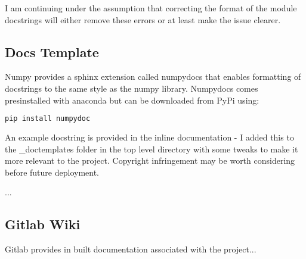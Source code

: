 \documentclass{article}
\begin{document}
I am continuing under the assumption that correcting the format of the module docstrings will either remove these errors or at least make the issue clearer.

\subsection{Docs Template}
Numpy provides a sphinx extension called numpydocs that enables formatting of docstrings to the same style as the numpy library. Numpydocs comes presinstalled with anaconda but can be downloaded from PyPi using:

\begin{lstlisting}[language=Python]
pip install numpydoc
\end{lstlisting}

An example docstring is provided in the inline documentation - I added this to the \_doctemplates folder in the top level directory with some tweaks to make it more relevant to the project. Copyright infringement may be worth considering before future deployment.

\noindent{}

...

\subsection{Gitlab Wiki}
Gitlab provides in built documentation associated with the project...
\end{document}
